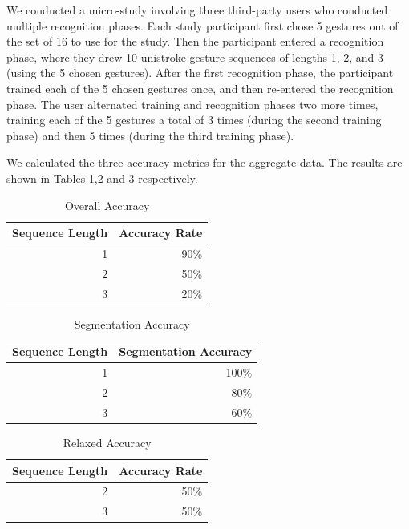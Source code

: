 \documentclass[twoside]{article}
\begin{document}
\begin{multicols}{2}
We conducted a micro-study involving three third-party users who conducted
multiple recognition phases. Each study participant first chose 5 gestures out
of the set of 16 to use for the study. Then the participant entered a
recognition phase, where they drew 10 unistroke gesture sequences of lengths 1,
2, and 3 (using the 5 chosen gestures). After the first recognition phase, the participant trained each of the
5 chosen gestures once, and then re-entered the recognition phase. The user
alternated training and recognition phases two more times, training each of the
5 gestures a total of 3 times (during the second training phase) and then 5 times (during the third training phase).

We calculated the three accuracy metrics for the aggregate data. The results are shown in Tables 1,2 and 3 respectively.

\begin{table}[H]
  \centering
  \caption{Overall Accuracy}
    \begin{tabular}{rr}
    \toprule
    Sequence Length & Accuracy Rate \\
    \midrule
    1     & 90\% \\
    2     & 50\% \\
    3     & 20\% \\
    \bottomrule
    \end{tabular}%
  \label{tab:addlabel}%
\end{table}%

\begin{table}[H]
  \centering
  \caption{Segmentation Accuracy}
    \begin{tabular}{rr}
    \toprule
	Sequence Length & Segmentation Accuracy \\
    \midrule
    1     & 100\% \\
    2     & 80\% \\
    3     & 60\% \\
    \bottomrule
    \end{tabular}%
  \label{tab:addlabel}%
\end{table}%

\begin{table}[H]
  \centering
  \caption{Relaxed Accuracy}
    \begin{tabular}{rr}
    \toprule
    Sequence Length & Accuracy Rate \\
    \midrule
    2     & 50\% \\
    3     & 50\% \\
    \bottomrule
    \end{tabular}%
  \label{tab:addlabel}%
\end{table}%


\end{multicols}
\end{document}
